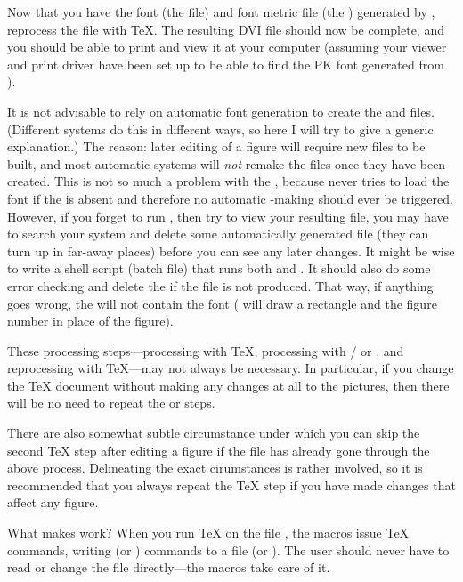 \documentclass[letterpaper]{article}
\begin{document}
Now that you have the font (the  file) and font metric file (the
) generated by \MF{}, reprocess the file 
with \TeX{}. The resulting DVI file should now be complete, and you should
be able to print and view it at your computer (assuming your viewer and
print driver have been set up to be able to find the PK font generated
from ).

It is not advisable to rely on automatic font generation to create the
 and  files. (Different systems do this in
different ways, so here I will try to give a generic explanation.) The
reason: later editing of a figure will require new files to be built,
and most automatic systems will \emph{not} remake the files once they
have been created. This is not so much a problem with the ,
because \mfp{} never tries to load the font if the  is absent
and therefore no automatic -making should ever be triggered.
However, if you forget to run , then try to view your
resulting file, you may have to search your system and delete some
automatically generated  file (they can turn up in far-away
places) before you can see any later changes. It might be wise to write
a shell script (batch file) that runs both \MF{} and . It
should also do some error checking and delete the  if the
 file is not produced. That way, if anything goes wrong, the
 will not contain the font (\mfp{} will draw a rectangle and
the figure number in place of the figure).

These processing steps---processing with \TeX{}, processing with
\MF{}\slash{} or \MP{}, and reprocessing with \TeX{}---may not always be
necessary. In particular, if you change the \TeX{} document without
making any changes at all to the pictures, then there will be no need to
repeat the \MF{} or \MP{} steps.

There are also somewhat subtle circumstance under which you can skip the
second \TeX{} step after editing a figure if the file  has already gone
through the above process. Delineating the exact cirumstances is rather
involved, so it is recommended that you always repeat the \TeX{} step if
you have made changes that affect any figure.

What makes \mfp{} work? When you run \TeX{} on the file
, the \mfp{} macros issue \TeX{}  commands,
writing \MF{} (or \MP{}) commands to a file  (or
).  The user should never have to read or change the file
 directly---the \mfp{} macros take care of it.
\end{document}
